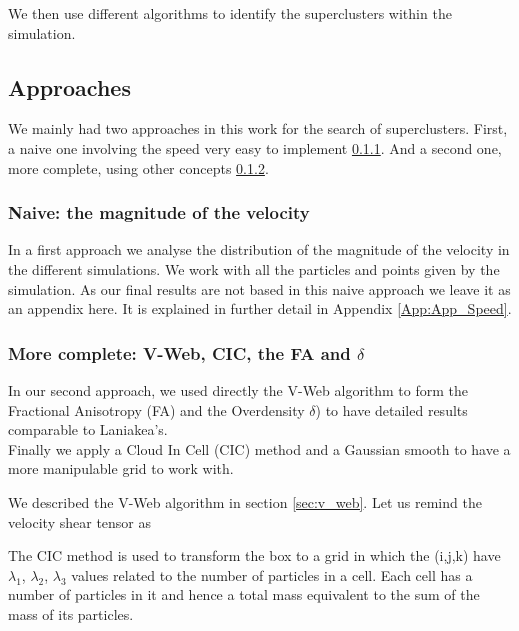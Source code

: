 \documentclass[12pt]{article}
\begin{document}
We then use different algorithms to identify the
 superclusters within the simulation.\\

\subsection{Approaches}
We mainly had two approaches in this work for the
 search of superclusters. First, a naive one
  involving the speed very easy to implement
   \ref{sec:naive_speed}. And a second one, more
    complete, using other concepts
     \ref{sec:approach_complete}.
\subsubsection{Naive: the magnitude of the velocity}
\label{sec:naive_speed}
\begin{par}
In a first approach we analyse the distribution of
 the magnitude of the velocity in the different
  simulations. We work with all the particles and
   points given by the simulation. As our final
    results are not based in this naive approach
     we leave it as an appendix here. It is
      explained in further detail in Appendix
       \ref{App:App_Speed}.
\end{par}

\subsubsection{More complete: V-Web, CIC, the FA and $\delta$}
\label{sec:approach_complete}
\begin{par}
In our second approach, we used directly the V-Web
 algorithm to form the Fractional Anisotropy (FA)
  and the Overdensity $\delta$) to have detailed
   results comparable to Laniakea's.\\
Finally we apply a Cloud In Cell (CIC) method and
 a Gaussian smooth to have a more manipulable grid
  to work with.\\
\end{par}


\begin{par}
We described the V-Web algorithm in section
 \ref{sec:v_web}. Let us remind the velocity shear
  tensor as 
\end{par}

\begin{par}
The CIC method is used to transform the box to a
 grid in which the (i,j,k) have {$\lambda_1$,
  $\lambda_2$, $\lambda_3$} values related to the
   number of particles in a cell.
Each cell has a number of particles in it and
 hence a total mass equivalent to the sum of the
  mass of its particles.
\end{par}
\end{document}
